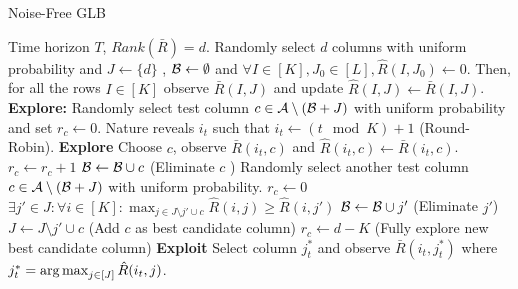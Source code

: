 \begin{algorithm}[!th]
\caption{Noise-Free GLB}
\label{alg:NFGLB}
\begin{algorithmic}
 Time horizon $T$, $Rank(\bar{R}) = d$.
 Randomly select $d$ columns with uniform probability and $J\leftarrow \lbrace d \rbrace$ , $\mathcal{B} \leftarrow \emptyset$ and $\forall I\in [K], J_0\in [L], \hat{R}(I,J_0) \leftarrow 0$.
\State Then, for all the rows $I\in[K]$ observe $\bar{R}(I,J)$ and update  $\hat{R}(I,J) \leftarrow \bar{R}(I,J)$.
\State \textbf{Explore: } Randomly select test column $c \in \mathcal{A} \setminus (\mathcal{B} + J)$ with uniform probability and set $r_c \leftarrow 0$.
\State Nature reveals $i_t$ such that $i_t \leftarrow (t \mod K) + 1$ (Round-Robin).
 \textbf{Explore}
\State Choose $c$, observe $\bar{R}(i_t,c)$ and $\hat{R}(i_t,c)\leftarrow \bar{R}(i_t,c)$.
\State $r_c \leftarrow r_c + 1$
\Else
\ColElim
\State {} 
\State  $\mathcal{B} \leftarrow \mathcal{B} \cup c$ (Eliminate $c$ )
\State Randomly select another test column $c \in \mathcal{A} \setminus (\mathcal{B} + J)$ with uniform probability.
\State $r_c \leftarrow 0$
\Else
\State $\exists j'\in J: \forall i\in [K]: \max_{j\in J \setminus{ j'} \cup c} \hat{R}(i,j) \geq \hat{R}(i,j')$
\State $\mathcal{B} \leftarrow \mathcal{B} \cup j' $ (Eliminate $j'$)
\State $J\leftarrow J \setminus{ j'} \cup c$ (Add $c$ as best candidate column)
\State $r_c \leftarrow d - K $ (Fully explore new best candidate column)
\EndIf
\EndColElim
\EndIf
{} \textbf{Exploit}
\State  Select column $j_t^*$ and observe $\bar{R}(i_t,j_t^*)$ where $j_t^* = \mathop{\rm arg\,max}_{j\in[J]} {\hat{R}(i_t,j)}$.
\EndIf
\EndFor
\end{algorithmic}
\end{algorithm}


